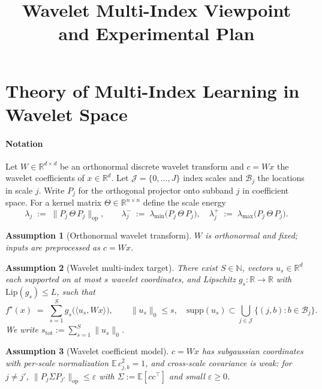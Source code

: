 \documentclass[11pt]{article}
\title{Wavelet Multi-Index Viewpoint and Experimental Plan}
\author{}
\date{}
\newtheorem{assumption}{Assumption}
\theoremstyle{remark}
\begin{document}
\maketitle
\section{Theory of Multi-Index Learning in Wavelet Space}\label{sec:theory-wavelet-multiindex}

\paragraph{Notation}
Let $W \in \mathbb{R}^{d \times d}$ be an orthonormal discrete wavelet transform and $c=Wx$ the wavelet coefficients of $x \in \mathbb{R}^d$. Let $\mathcal{J}=\{0,\dots,J\}$ index scales and $\mathcal{B}_j$ the locations in scale $j$. Write $P_j$ for the orthogonal projector onto subband $j$ in coefficient space. For a kernel matrix $\Theta \in \mathbb{R}^{n\times n}$ define the scale energy
\[
\lambda_j \;:=\; \|P_j\,\Theta\,P_j\|_{\mathrm{op}}, \qquad \lambda_j^{-} \;:=\; \lambda_{\min}\!\big(P_j\,\Theta\,P_j\big), \quad \lambda_j^{+} \;:=\; \lambda_{\max}\!\big(P_j\,\Theta\,P_j\big).
\]

\begin{assumption}[Orthonormal wavelet transform]
$W$ is orthonormal and fixed; inputs are preprocessed as $c=Wx$. 
\end{assumption}

\begin{assumption}[Wavelet multi-index target]\label{ass:multiindex}
There exist $S \in \mathbb{N}$, vectors $u_s \in \mathbb{R}^d$ each supported on at most $s$ wavelet coordinates, and Lipschitz $g_s\colon\mathbb{R}\to\mathbb{R}$ with $\mathrm{Lip}(g_s) \le L$, such that
\[
f^\star(x) \;=\; \sum_{s=1}^{S} g_s\!\big(\langle u_s, Wx \rangle\big), 
\qquad \|u_s\|_0 \le s, \quad \mathrm{supp}(u_s) \subset \bigcup_{j \in \mathcal{J}} \{(j,b): b \in \mathcal{B}_j\}.
\]
We write $s_\mathrm{tot} := \sum_{s=1}^S \|u_s\|_0$.
\end{assumption}

\begin{assumption}[Wavelet coefficient model]\label{ass:coeff}
$c=Wx$ has subgaussian coordinates with per-scale normalization $\mathbb{E}\,c_{j,b}^2=1$, and cross-scale covariance is weak: for $j \neq j'$, $\|P_j \Sigma P_{j'}\|_{\mathrm{op}} \le \varepsilon$ with $\Sigma := \mathbb{E}[cc^\top]$ and small $\varepsilon \ge 0$.
\end{assumption}
\end{document}
